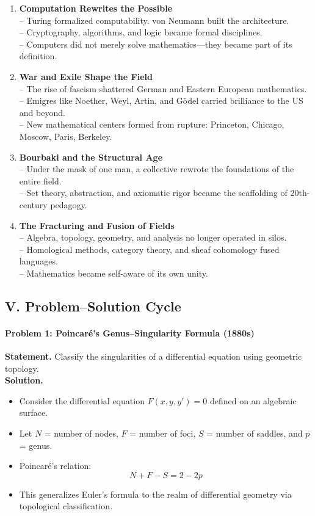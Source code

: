 \documentclass[9pt]{article}
\begin{document}
\begin{enumerate}
  \item \textbf{Computation Rewrites the Possible} \\
  -- Turing formalized computability. von Neumann built the architecture. \\
  -- Cryptography, algorithms, and logic became formal disciplines. \\
  -- Computers did not merely solve mathematics—they became part of its definition.

  \item \textbf{War and Exile Shape the Field} \\
  -- The rise of fascism shattered German and Eastern European mathematics. \\
  -- Emigres like Noether, Weyl, Artin, and Gödel carried brilliance to the US and beyond. \\
  -- New mathematical centers formed from rupture: Princeton, Chicago, Moscow, Paris, Berkeley.

  \item \textbf{Bourbaki and the Structural Age} \\
  -- Under the mask of one man, a collective rewrote the foundations of the entire field. \\
  -- Set theory, abstraction, and axiomatic rigor became the scaffolding of 20th-century pedagogy.

  \item \textbf{The Fracturing and Fusion of Fields} \\
  -- Algebra, topology, geometry, and analysis no longer operated in silos. \\
  -- Homological methods, category theory, and sheaf cohomology fused languages. \\
  -- Mathematics became self-aware of its own unity.
\end{enumerate}

\newpage

\subsection*{V. Problem--Solution Cycle}

\paragraph{Problem 1: Poincaré’s Genus--Singularity Formula (1880s)}
\textbf{Statement.} Classify the singularities of a differential equation using geometric topology. \\
\textbf{Solution.}
\begin{itemize}
  \item Consider the differential equation \( F(x, y, y') = 0 \) defined on an algebraic surface.
  \item Let \( N \) = number of nodes, \( F \) = number of foci, \( S \) = number of saddles, and \( p \) = genus.
  \item Poincaré’s relation:
  \[
  N + F - S = 2 - 2p
  \]
  \item This generalizes Euler's formula to the realm of differential geometry via topological classification.
\end{itemize}
\end{document}
